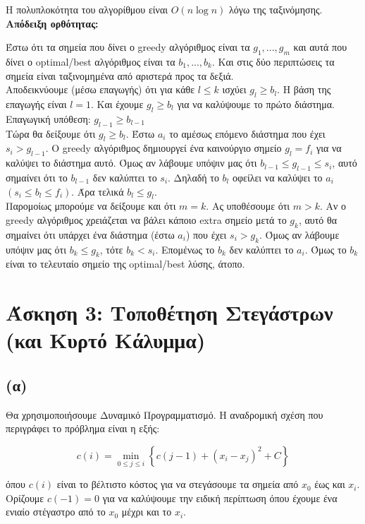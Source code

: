 		Η πολυπλοκότητα του αλγορίθμου είναι $O(n \log n)$ λόγω της ταξινόμησης. \\
		
		\textbf{Απόδειξη ορθότητας:}
		
		Έστω ότι τα σημεία που δίνει ο greedy αλγόριθμος είναι τα $g_1, ..., g_m$ και αυτά που δίνει ο optimal/best αλγόριθμος είναι τα $b_1, ..., b_k$. Και στις δύο περιπτώσεις τα σημεία είναι ταξινομημένα από αριστερά προς τα δεξιά. \\
		
		Αποδεικνύουμε (μέσω επαγωγής) ότι για κάθε $l \leq k$ ισχύει $g_l \geq b_l$. Η βάση της επαγωγής είναι $l = 1$. Και έχουμε $g_l \geq b_l$ για να καλύψουμε το πρώτο διάστημα. \\
		
		Επαγωγική υπόθεση: $g_{l-1} \geq b_{l-1}$ \\
		
		Τώρα θα δείξουμε ότι $g_l \geq b_l$. Έστω $a_i$ το αμέσως επόμενο διάστημα που έχει $s_i > g_{l-1}$. Ο greedy αλγόριθμος δημιουργεί ένα καινούργιο σημείο $g_l = f_i$ για να καλύψει το διάστημα αυτό. Όμως αν λάβουμε υπόψιν μας ότι $b_{l-1} \leq g_{l-1} \leq s_i$, αυτό σημαίνει ότι το $b_{l-1}$ δεν καλύπτει το $s_i$. Δηλαδή το $b_l$ οφείλει να καλύψει το $a_i$ $(s_i \leq b_l \leq f_i)$. Άρα τελικά $b_l \leq g_l$. \\
		
		Παρομοίως μπορούμε να δείξουμε και ότι $m = k$. Ας υποθέσουμε ότι $m > k$. Αν ο greedy αλγόριθμος χρειάζεται να βάλει κάποιο extra σημείο μετά το $g_k$, αυτό θα σημαίνει ότι υπάρχει ένα διάστημα (έστω $a_i$) που έχει $s_i > g_k$. Όμως αν λάβουμε υπόψιν μας ότι $b_k \leq g_k$, τότε $b_k < s_i$. Επομένως το $b_k$ δεν καλύπτει το $a_i$. Όμως το $b_k$ είναι το τελευταίο σημείο της optimal/best λύσης, άτοπο.
	
	\section*{Άσκηση 3: Τοποθέτηση Στεγάστρων (και Κυρτό Κάλυμμα)}
		\subsection*{(α)}
			Θα χρησιμοποιήσουμε Δυναμικό Προγραμματισμό. Η αναδρομική σχέση που περιγράφει το πρόβλημα είναι η εξής:
			
			\[
				c(i) = \min_{0 \leq j \leq i}\left\{c(j-1) + (x_i - x_j)^2 + C\right\}
			\]
			
			όπου $c(i)$ είναι το βέλτιστο κόστος για να στεγάσουμε τα σημεία από $x_0$ έως και $x_i$. Ορίζουμε $c(-1) = 0$ για να καλύψουμε την ειδική περίπτωση όπου έχουμε ένα ενιαίο στέγαστρο από το $x_0$ μέχρι και το $x_i$.
			
